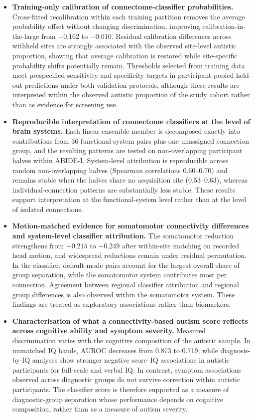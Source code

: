 \begin{itemize}

\item \textbf{Training-only calibration of connectome-classifier probabilities.}
Cross-fitted recalibration within each training partition removes the average probability offset without changing discrimination, improving calibration-in-the-large from $-0.162$ to $-0.010$. Residual calibration differences across withheld sites are strongly associated with the observed site-level autistic proportion, showing that average calibration is restored while site-specific probability shifts potentially remain. Thresholds selected from training data meet prespecified sensitivity and specificity targets in participant-pooled held-out predictions under both validation protocols, although these results are interpreted within the observed autistic proportion of the study cohort rather than as evidence for screening use.

\item \textbf{Reproducible interpretation of connectome classifiers at the level of brain systems.}
Each linear ensemble member is decomposed exactly into contributions from 36 functional-system pairs plus one unassigned connection group, and the resulting patterns are tested on non-overlapping participant halves within ABIDE-I. System-level attribution is reproducible across random non-overlapping halves (Spearman correlations 0.60--0.70) and remains stable when the halves share no acquisition site (0.53--0.63), whereas individual-connection patterns are substantially less stable. These results support interpretation at the functional-system level rather than at the level of isolated connections.

\item \textbf{Motion-matched evidence for somatomotor connectivity differences and system-level classifier attribution.}
The somatomotor reduction strengthens from $-0.215$ to $-0.249$ after within-site matching on recorded head motion, and widespread reductions remain under residual permutation. In the classifier, default-mode pairs account for the largest overall share of group separation, while the somatomotor system contributes most per connection. Agreement between regional classifier attribution and regional group differences is also observed within the somatomotor system. These findings are treated as exploratory associations rather than biomarkers.

\item \textbf{Characterisation of what a connectivity-based autism score reflects across cognitive ability and symptom severity.}
Measured discrimination varies with the cognitive composition of the autistic sample. In unmatched IQ bands, AUROC decreases from 0.873 to 0.719, while diagnosis-by-IQ analyses show stronger negative score--IQ associations in autistic participants for full-scale and verbal IQ. In contrast, symptom associations observed across diagnostic groups do not survive correction within autistic participants. The classifier score is therefore supported as a measure of diagnostic-group separation whose performance depends on cognitive composition, rather than as a measure of autism severity.


\end{itemize}
